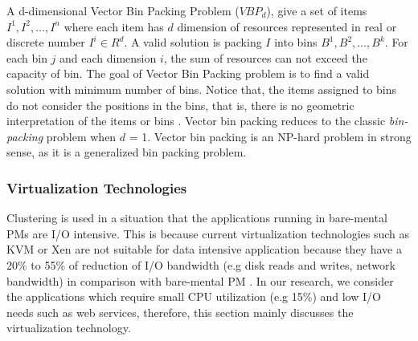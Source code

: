 A d-dimensional Vector Bin Packing Problem ($VBP_d$), give a set of items $I^1, I^2, \dots, I^n$ where each item has $d$ dimension of resources represented in real or discrete number $I^i \in R^d$. A valid solution is packing $I$ into bins $B^1, B^2, \dots, B^k$. For each bin $j$ and each dimension $i$, the sum of resources can not exceed the capacity of bin. The goal of Vector Bin Packing problem is to find a valid solution with minimum number of bins. Notice that, the items assigned to bins do not consider the positions in the bins, that is, there is no geometric interpretation of the items or bins \cite{Johnson:2016wp}.  Vector bin packing reduces to the classic \emph{bin-packing} problem when $d$ = 1. Vector bin packing is an NP-hard problem in strong sense, as it is a generalized bin packing problem.





\subsubsection{Virtualization Technologies}

 Clustering is used in a situation that the applications running in bare-mental PMs are I/O intensive. This is because current virtualization technologies  such as KVM \cite{Kivity:2007wu} or Xen \cite{Barham:2003cj} are not suitable for data intensive application because they have a 20\% to 55\% of reduction of I/O bandwidth (e.g disk reads and writes, network bandwidth) in comparison with bare-mental PM \cite{Shafer:2010vh}. In our research, we consider the applications which require small CPU utilization (e.g 15\%) and low I/O needs such as web services, therefore, this section mainly discusses the virtualization technology.

